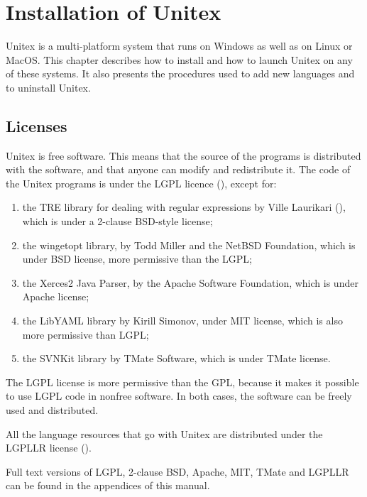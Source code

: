 \chapter{Installation of Unitex}
\label{chap-install}

Unitex is a multi-platform system that runs on Windows as well as on Linux or
MacOS. This chapter describes how to install and how to launch Unitex on any of
these systems. It also presents the procedures used to add new languages and to
uninstall Unitex.

\section{Licenses}
\label{section-licences}
Unitex is free software. This means that the source of the programs is
distributed with the software, and that anyone can modify and redistribute it.
The code of the Unitex programs is under the LGPL licence (\cite{LGPL}), except
for:

\begin{enumerate}
\item the TRE library for dealing with regular expressions by Ville Laurikari
(\cite{TRE}), which is under a 2-clause BSD-style license;

\item the wingetopt library, by Todd Miller and the NetBSD Foundation,
 which is under BSD license, more permissive than the LGPL;

\item the Xerces2 Java Parser, by the Apache Software Foundation, which is under Apache license;

\item  the LibYAML library by Kirill Simonov, under MIT license, which is 
also more permissive than LGPL;

\item the SVNKit library by TMate Software, which is under TMate license.
\end{enumerate}

\noindent The LGPL license is more permissive than the GPL,
because it makes it possible to use LGPL code in nonfree software. 
In both cases, the software can be freely used and distributed.

\bigskip
\noindent All the language resources that go with Unitex are distributed under the LGPLLR
license  (\cite{LGPLLR}).

\bigskip
\noindent Full text versions of LGPL, 2-clause BSD, Apache, MIT, TMate and LGPLLR can be found in
the appendices of this manual.

